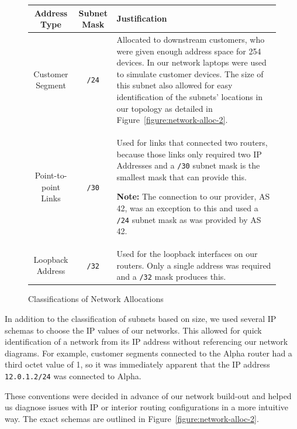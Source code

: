 \begin{figure}[!ht]
    \caption{Classifications of Network Allocations}
    \label{figure:network-alloc-1}
    \centering
    \begin{tabular}{|c|c|p{5.5cm}|}

        \hline
        \textbf{Address Type} & \textbf{Subnet Mask} & \textbf{Justification} \\

        \hline
        Customer Segment & \texttt{/24} & Allocated to downstream customers,
        who were given enough address space for 254 devices. In our network
        laptops were used to simulate customer devices. The size of this subnet
        also allowed for easy identification of the subnets' locations in our
        topology as detailed in Figure~\ref{figure:network-alloc-2}.\\

        \hline
        Point-to-point Links & \texttt{/30} & Used for links that connected two
        routers, because those links only required two IP Addresses and a
        \texttt{/30} subnet mask is the smallest mask that can provide this.
        
        \textbf{Note:} The connection to our provider, AS 42, was an exception
        to this and used a \texttt{/24} subnet mask as was provided by AS 42.\\

        \hline
        Loopback Address & \texttt{/32} & Used for the loopback interfaces on
        our routers. Only a single address was required and a \texttt{/32} mask
        produces this.\\

        \hline
    \end{tabular}
\end{figure}
In addition to the classification of subnets based on size, we used several IP
schemas to choose the IP values of our networks. This allowed for quick
identification of a network from its IP address without referencing our network
diagrams. For example, customer segments connected to the Alpha router had a
third octet value of 1, so it was immediately apparent that the IP address
\texttt{12.0.1.2/24} was connected to Alpha.

These conventions were decided in advance of our network build-out and helped
us diagnose issues with IP or interior routing configurations in a more
intuitive way. The exact schemas are outlined in Figure~\ref{figure:network-alloc-2}.

